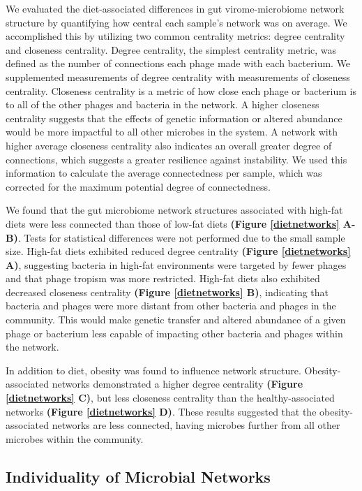 \documentclass[12pt,]{article}
\begin{document}
We evaluated the diet-associated differences in gut virome-microbiome
network structure by quantifying how central each sample's network was
on average. We accomplished this by utilizing two common centrality
metrics: degree centrality and closeness centrality. Degree centrality,
the simplest centrality metric, was defined as the number of connections
each phage made with each bacterium. We supplemented measurements of
degree centrality with measurements of closeness centrality. Closeness
centrality is a metric of how close each phage or bacterium is to all of
the other phages and bacteria in the network. A higher closeness
centrality suggests that the effects of genetic information or altered
abundance would be more impactful to all other microbes in the system. A
network with higher average closeness centrality also indicates an
overall greater degree of connections, which suggests a greater
resilience against instability. We used this information to calculate
the average connectedness per sample, which was corrected for the
maximum potential degree of connectedness.

We found that the gut microbiome network structures associated with
high-fat diets were less connected than those of low-fat diets
\textbf{(Figure \ref{dietnetworks} A-B)}. Tests for statistical
differences were not performed due to the small sample size. High-fat
diets exhibited reduced degree centrality \textbf{(Figure
\ref{dietnetworks} A)}, suggesting bacteria in high-fat environments
were targeted by fewer phages and that phage tropism was more
restricted. High-fat diets also exhibited decreased closeness centrality
\textbf{(Figure \ref{dietnetworks} B)}, indicating that bacteria and
phages were more distant from other bacteria and phages in the
community. This would make genetic transfer and altered abundance of a
given phage or bacterium less capable of impacting other bacteria and
phages within the network.

In addition to diet, obesity was found to influence network structure.
Obesity-associated networks demonstrated a higher degree centrality
\textbf{(Figure \ref{dietnetworks} C)}, but less closeness centrality
than the healthy-associated networks \textbf{(Figure \ref{dietnetworks}
D)}. These results suggested that the obesity-associated networks are
less connected, having microbes further from all other microbes within
the community.

\subsection{Individuality of Microbial
Networks}\label{individuality-of-microbial-networks}
\end{document}
